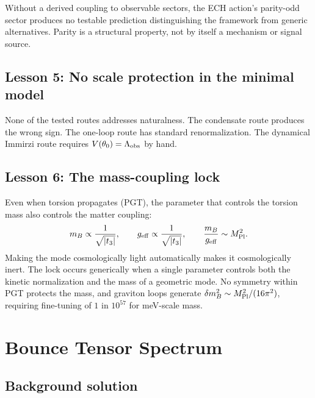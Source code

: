 \documentclass[aps,prd,twocolumn,superscriptaddress,showpacs,preprintnumbers,
  nofootinbib,longbibliography,floatfix]{revtex4-2}
\newcommand{\Lobs}{\Lambda_{\rm obs}}
\newcommand{\MPl}{M_{\rm Pl}}
\newcommand{\geff}{g_{\rm eff}}
\begin{document}
Without a derived coupling to observable sectors, the ECH action's
parity-odd sector produces no testable prediction distinguishing the
framework from generic alternatives. Parity is a structural property,
not by itself a mechanism or signal source.

\subsection{Lesson 5: No scale protection in the minimal model}

None of the tested routes addresses naturalness. The condensate route
produces the wrong sign. The one-loop route has standard renormalization.
The dynamical Immirzi route requires $V(\theta_0) = \Lobs$ by hand.

\subsection{Lesson 6: The mass-coupling lock}\label{sec:lesson6}

Even when torsion propagates (PGT), the parameter that controls the
torsion mass also controls the matter coupling:
\begin{equation}\label{eq:lock}
  m_B \propto \frac{1}{\sqrt{|t_3|}}, \qquad
  \geff \propto \frac{1}{\sqrt{|t_3|}}, \qquad
  \frac{m_B}{\geff} \sim \MPl^2.
\end{equation}
Making the mode cosmologically light automatically makes it
cosmologically inert. The lock occurs generically when a single parameter
controls both the kinetic normalization and the mass of a geometric mode.
No symmetry within PGT protects the mass, and graviton loops generate
$\delta m_B^2 \sim \MPl^2/(16\pi^2)$, requiring fine-tuning of $1$ in
$10^{57}$ for meV-scale mass.



\section{Bounce Tensor Spectrum}\label{sec:tensor}

\subsection{Background solution}\label{sec:background}
\end{document}
